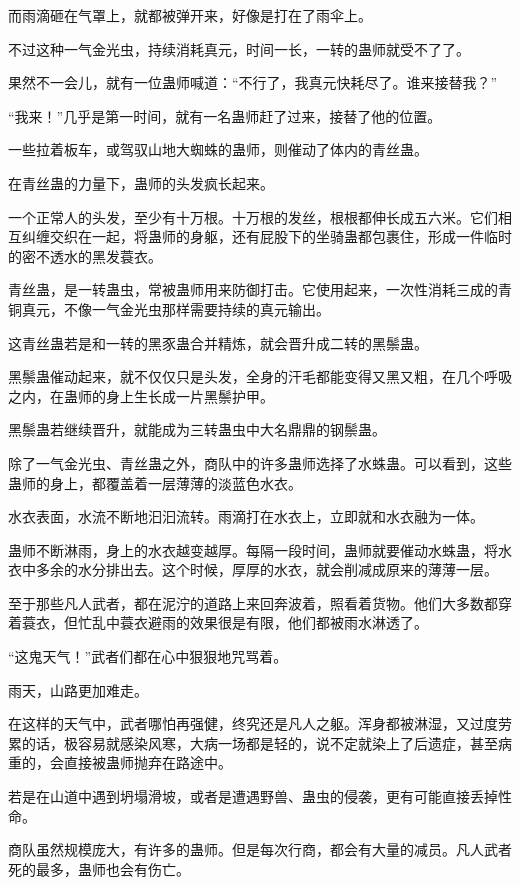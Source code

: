 \begin{this_body}
而雨滴砸在气罩上，就都被弹开来，好像是打在了雨伞上。

不过这种一气金光虫，持续消耗真元，时间一长，一转的蛊师就受不了了。

果然不一会儿，就有一位蛊师喊道：“不行了，我真元快耗尽了。谁来接替我？”

“我来！”几乎是第一时间，就有一名蛊师赶了过来，接替了他的位置。

一些拉着板车，或驾驭山地大蜘蛛的蛊师，则催动了体内的青丝蛊。

在青丝蛊的力量下，蛊师的头发疯长起来。

一个正常人的头发，至少有十万根。十万根的发丝，根根都伸长成五六米。它们相互纠缠交织在一起，将蛊师的身躯，还有屁股下的坐骑蛊都包裹住，形成一件临时的密不透水的黑发蓑衣。

青丝蛊，是一转蛊虫，常被蛊师用来防御打击。它使用起来，一次性消耗三成的青铜真元，不像一气金光虫那样需要持续的真元输出。

这青丝蛊若是和一转的黑豕蛊合并精炼，就会晋升成二转的黑鬃蛊。

黑鬃蛊催动起来，就不仅仅只是头发，全身的汗毛都能变得又黑又粗，在几个呼吸之内，在蛊师的身上生长成一片黑鬃护甲。

黑鬃蛊若继续晋升，就能成为三转蛊虫中大名鼎鼎的钢鬃蛊。

除了一气金光虫、青丝蛊之外，商队中的许多蛊师选择了水蛛蛊。可以看到，这些蛊师的身上，都覆盖着一层薄薄的淡蓝色水衣。

水衣表面，水流不断地汩汩流转。雨滴打在水衣上，立即就和水衣融为一体。

蛊师不断淋雨，身上的水衣越变越厚。每隔一段时间，蛊师就要催动水蛛蛊，将水衣中多余的水分排出去。这个时候，厚厚的水衣，就会削减成原来的薄薄一层。

至于那些凡人武者，都在泥泞的道路上来回奔波着，照看着货物。他们大多数都穿着蓑衣，但忙乱中蓑衣避雨的效果很是有限，他们都被雨水淋透了。

“这鬼天气！”武者们都在心中狠狠地咒骂着。

雨天，山路更加难走。

在这样的天气中，武者哪怕再强健，终究还是凡人之躯。浑身都被淋湿，又过度劳累的话，极容易就感染风寒，大病一场都是轻的，说不定就染上了后遗症，甚至病重的，会直接被蛊师抛弃在路途中。

若是在山道中遇到坍塌滑坡，或者是遭遇野兽、蛊虫的侵袭，更有可能直接丢掉性命。

商队虽然规模庞大，有许多的蛊师。但是每次行商，都会有大量的减员。凡人武者死的最多，蛊师也会有伤亡。


\end{this_body}
